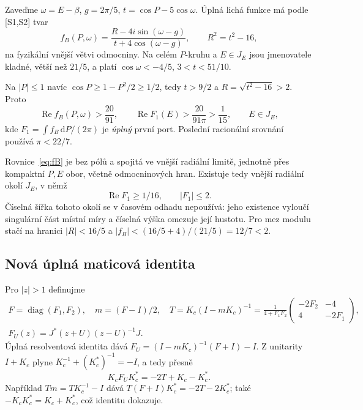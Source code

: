 \documentclass[11pt,a4paper]{article}
\newcommand{\dd}{\,\mathrm d}
\newcommand{\Rea}{\operatorname{Re}}
\theoremstyle{remark}\newtheorem{remark}[theorem]{Poznámka}
\numberwithin{equation}{section}
\begin{document}
Zaveďme \(\omega=E-\beta\), \(g=2\pi/5\), \(t=\cos P-5\cos\omega\). Úplná lichá funkce má podle [S1,S2] tvar
\begin{equation}
f_B(P,\omega)=\frac{R-4i\sin(\omega-g)}{t+4\cos(\omega-g)},
\qquad R^2=t^2-16,
\label{eq:fB}
\end{equation}
na fyzikální vnější větvi odmocniny. Na celém \(P\)-kruhu a \(E\in J_E\) jsou jmenovatele kladné, větší než \(21/5\), a platí
\(\cos\omega<-4/5\), \(3<t<51/10\).

Na \(|P|\le1\) navíc \(\cos P\ge1-P^2/2\ge1/2\), tedy
\(t>9/2\) a \(R=\sqrt{t^2-16}>2\). Proto
\[
\Rea f_B(P,\omega)>\frac{20}{91},\qquad
\Rea F_1(E)>\frac{20}{91\pi}>\frac1{15},\qquad E\in J_E,
\]
kde \(F_1=\int f_B\dd P/(2\pi)\) je \emph{úplný} první port.
Poslední racionální srovnání používá \(\pi<22/7\).

Rovnice~\eqref{eq:fB} je bez pólů a spojitá ve vnější radiální limitě, jednotně přes kompaktní \(P,E\) obor, včetně odmocninových hran. Existuje tedy vnější radiální okolí \(J_E\), v němž
\begin{equation}
\Rea F_1\ge1/16,\qquad |F_1|\le2.
\label{eq:F1collar}
\end{equation}
Číselná šířka tohoto okolí se v časovém odhadu nepoužívá: jeho existence vyloučí singulární část místní míry a číselná výška omezuje její hustotu. Pro mez modulu stačí na hranici
\(|R|<16/5\) a \(|f_B|<(16/5+4)/(21/5)=12/7<2\).

\subsection{Nová úplná maticová identita}

Pro \(|z|>1\) definujme
\begin{gather}
F=\operatorname{diag}(F_1,F_2),\quad m=(F-I)/2,\quad
T=K_c(I-mK_c)^{-1}
=\frac1{4+F_1F_2}\begin{pmatrix}-2F_2&-4\\4&-2F_1\end{pmatrix},\label{eq:T}\\
F_U(z)=J^*(z+U)(z-U)^{-1}J.
\end{gather}
Úplná resolventová identita dává
\(F_U=(I-mK_c)^{-1}(F+I)-I\).
Z unitarity \(I+K_c\) plyne
\(K_c^{-1}+(K_c^*)^{-1}=-I\), a tedy přesně
\begin{equation}
\boxed{K_cF_UK_c^*=-2T+K_c-K_c^*.}
\label{eq:matrixid}
\end{equation}
Například \(Tm=TK_c^{-1}-I\) dává
\(T(F+I)K_c^*=-2T-2K_c^*\); také
\(-K_cK_c^*=K_c+K_c^*\), což identitu dokazuje.
\end{document}
